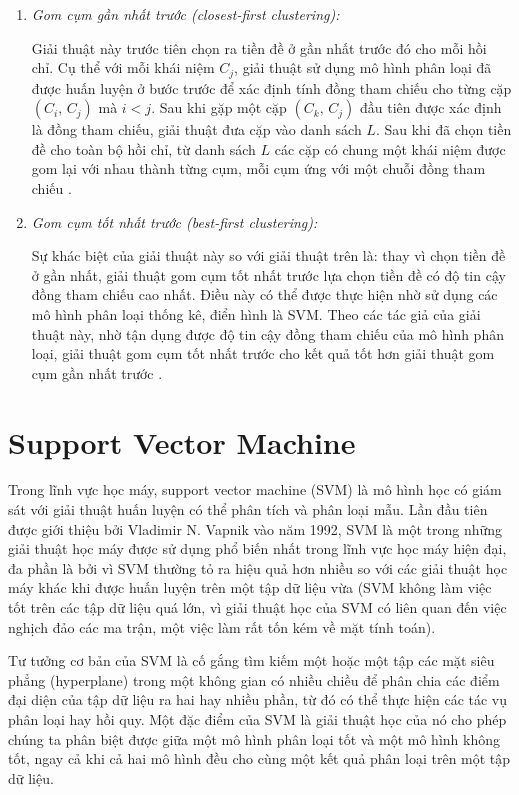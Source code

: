 \begin{enumerate}[parsep=0pt]
\item \emph{Gom cụm gần nhất trước (closest-first clustering):}

Giải thuật này trước tiên chọn ra tiền đề ở gần nhất trước đó cho mỗi hồi chỉ. Cụ thể với mỗi khái niệm $C_j$, giải thuật sử dụng mô hình phân loại đã được huấn luyện ở bước trước để xác định tính đồng tham chiếu cho từng cặp $(C_i,\,C_j)$ mà $i<j$. Sau khi gặp một cặp $(C_k,\,C_j)$ đầu tiên được xác định là đồng tham chiếu, giải thuật đưa cặp vào danh sách $L$. Sau khi đã chọn tiền đề cho toàn bộ hồi chỉ, từ danh sách $L$ các cặp có chung một khái niệm được gom lại với nhau thành từng cụm, mỗi cụm ứng với một chuỗi đồng tham chiếu \cite{Soon2001}.
\item \emph{Gom cụm tốt nhất trước (best-first clustering):}

Sự khác biệt của giải thuật này so với giải thuật trên là: thay vì chọn tiền đề ở gần nhất, giải thuật gom cụm tốt nhất trước lựa chọn tiền đề có độ tin cậy đồng tham chiếu cao nhất. Điều này có thể được thực hiện nhờ sử dụng các mô hình phân loại thống kê, điển hình là SVM. Theo các tác giả của giải thuật này, nhờ tận dụng được độ tin cậy đồng tham chiếu của mô hình phân loại, giải thuật gom cụm tốt nhất trước cho kết quả tốt hơn giải thuật gom cụm gần nhất trước \cite{VincentNg2002a}.
\end{enumerate}

\section{Support Vector Machine}
Trong lĩnh vực học máy, support vector machine (SVM) là mô hình học có giám sát với giải thuật huấn luyện có thể phân tích và phân loại mẫu. Lần đầu tiên được giới thiệu bởi Vladimir N. Vapnik vào năm 1992, SVM là một trong những giải thuật học máy được sử dụng phổ biến nhất trong lĩnh vực học máy hiện đại, đa phần là bởi vì SVM thường tỏ ra hiệu quả hơn nhiều so với các giải thuật học máy khác khi được huấn luyện trên một tập dữ liệu vừa (SVM không làm việc tốt trên các tập dữ liệu quá lớn, vì giải thuật học của SVM có liên quan đến việc nghịch đảo các ma trận, một việc làm rất tốn kém về mặt tính toán). 

Tư tưởng cơ bản của SVM là cố gắng tìm kiếm một hoặc một tập các mặt siêu phẳng (hyperplane) trong một không gian có nhiều chiều để phân chia các điểm đại diện của tập dữ liệu ra hai hay nhiều phần, từ đó có thể thực hiện các tác vụ phân loại hay hồi quy. Một đặc điểm của SVM là giải thuật học của nó cho phép chúng ta phân biệt được giữa một mô hình phân loại tốt và một mô hình không tốt, ngay cả khi cả hai mô hình đều cho cùng một kết quả phân loại trên một tập dữ liệu.

